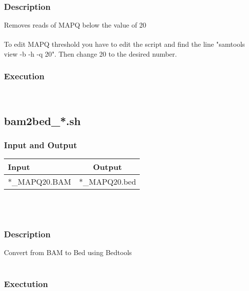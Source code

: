 \documentclass[14pt]{article}
\begin{document}
\subsubsection{Description}
Removes reads of MAPQ below the value of 20\\
\\
To edit MAPQ threshold you have to edit the script and find the line "samtools view -b -h -q 20". Then change 20 to the desired number.\\
\subsubsection{Execution}
\\

\subsection{bam2bed\_*.sh}
\subsubsection{Input and Output}
\begin{tabular}{l |c }

Input & Output \\
\hline
*\_MAPQ20.BAM & *\_MAPQ20.bed\\
\end{tabular}\\
\\
\subsubsection{Description}
Convert from BAM to Bed using Bedtools\\
\\
\subsubsection{Exectution}
\\
\end{document}
